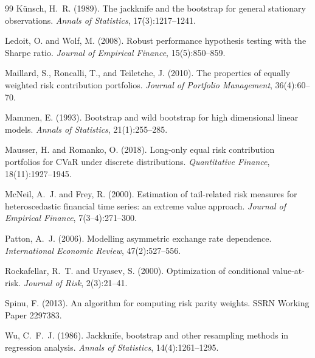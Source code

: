 \documentclass[11pt]{article}
\newcommand{\1}{\mathbf{1}}
\begin{document}
\begin{thebibliography}{99}
K{\"u}nsch, H.~R. (1989). The jackknife and the bootstrap for general stationary observations.
\emph{Annals of Statistics}, 17(3):1217--1241.

Ledoit, O. and Wolf, M. (2008). Robust performance hypothesis testing with the Sharpe ratio.
\emph{Journal of Empirical Finance}, 15(5):850--859.

Maillard, S., Roncalli, T., and Te{\"i}letche, J. (2010). The properties of equally weighted risk
contribution portfolios. \emph{Journal of Portfolio Management}, 36(4):60--70.

Mammen, E. (1993). Bootstrap and wild bootstrap for high dimensional linear models. \emph{Annals of
Statistics}, 21(1):255--285.

Mausser, H. and Romanko, O. (2018). Long-only equal risk contribution portfolios for CVaR under discrete
distributions. \emph{Quantitative Finance}, 18(11):1927--1945.

McNeil, A.~J. and Frey, R. (2000). Estimation of tail-related risk measures for heteroscedastic financial
time series: an extreme value approach. \emph{Journal of Empirical Finance}, 7(3--4):271--300.

Patton, A.~J. (2006). Modelling asymmetric exchange rate dependence. \emph{International Economic Review},
47(2):527--556.

Rockafellar, R.~T. and Uryasev, S. (2000). Optimization of conditional value-at-risk. \emph{Journal of
Risk}, 2(3):21--41.

Spinu, F. (2013). An algorithm for computing risk parity weights. SSRN Working Paper 2297383.

Wu, C.~F.~J. (1986). Jackknife, bootstrap and other resampling methods in regression analysis.
\emph{Annals of Statistics}, 14(4):1261--1295.

\end{thebibliography}
\end{document}

